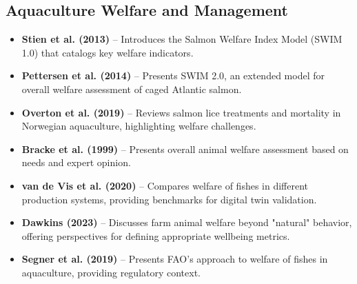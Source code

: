 \documentclass[11pt,a4paper]{article}
\begin{document}
\subsection*{Aquaculture Welfare and Management}
\begin{itemize}
    \item \textbf{Stien et al. (2013)} \cite{stien2013salmon} -- Introduces the Salmon Welfare Index Model (SWIM 1.0) that catalogs key welfare indicators.
    
    \item \textbf{Pettersen et al. (2014)} \cite{pettersen2014salmon} -- Presents SWIM 2.0, an extended model for overall welfare assessment of caged Atlantic salmon.
    
    \item \textbf{Overton et al. (2019)} \cite{overton2019salmon} -- Reviews salmon lice treatments and mortality in Norwegian aquaculture, highlighting welfare challenges.
    
    \item \textbf{Bracke et al. (1999)} \cite{bracke1999overall} -- Presents overall animal welfare assessment based on needs and expert opinion.
    
    \item \textbf{van de Vis et al. (2020)} \cite{van2020welfare} -- Compares welfare of fishes in different production systems, providing benchmarks for digital twin validation.
    
    \item \textbf{Dawkins (2023)} \cite{dawkins2023farm} -- Discusses farm animal welfare beyond "natural" behavior, offering perspectives for defining appropriate wellbeing metrics.
    
    \item \textbf{Segner et al. (2019)} \cite{segner2019welfare} -- Presents FAO's approach to welfare of fishes in aquaculture, providing regulatory context.
\end{itemize}
\end{document}
